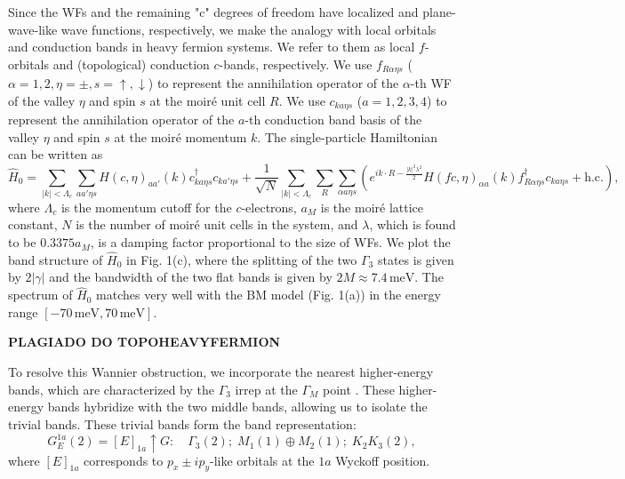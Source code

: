 Since the WFs and the remaining "c" degrees of freedom have localized and plane-wave-like wave functions, respectively, we make the analogy with local orbitals and conduction bands in heavy fermion systems. We refer to them as local \( f \)-orbitals and (topological) conduction \( c \)-bands, respectively. We use \( f_{R\alpha\eta s} \) (\(\alpha = 1, 2, \eta = \pm, s = \uparrow, \downarrow\)) to represent the annihilation operator of the \(\alpha\)-th WF of the valley \( \eta \) and spin \( s \) at the moiré unit cell \( R \). We use \( c_{ka\eta s} \) (\( a = 1, 2, 3, 4 \)) to represent the annihilation operator of the \( a\)-th conduction band basis of the valley \( \eta \) and spin \( s \) at the moiré momentum \( k \). The single-particle Hamiltonian can be written as
\[
\hat{H}_0 =
\sum_{|k| < \Lambda_c}
\sum_{aa'\eta s}
H(c,\eta)_{aa'}(k) c^\dagger_{ka\eta s} c_{ka'\eta s}
+ \frac{1}{\sqrt{N}}
\sum_{|k| < \Lambda_c}
\sum_{R}
\sum_{\alpha a \eta s}
\left( e^{i k \cdot R - \frac{|k|^2 \lambda^2}{2}}
H(fc,\eta)_{\alpha a}(k) f^\dagger_{R\alpha\eta s} c_{ka\eta s} + \text{h.c.} \right),
\]
where \( \Lambda_c \) is the momentum cutoff for the \( c \)-electrons, \( a_M \) is the moiré lattice constant, \( N \) is the number of moiré unit cells in the system, and \( \lambda \), which is found to be \( 0.3375 a_M \), is a damping factor proportional to the size of WFs. We plot the band structure of \( \hat{H}_0 \) in Fig. 1(c), where the splitting of the two \(\Gamma_3\) states is given by \( 2|\gamma| \) and the bandwidth of the two flat bands is given by \( 2M \approx 7.4\, \text{meV} \). The spectrum of \( \hat{H}_0 \) matches very well with the BM model (Fig. 1(a)) in the energy range \([-70\, \text{meV}, 70\, \text{meV}]\).

\textbf{PLAGIADO DO TOPOHEAVYFERMION}

\n\n


To resolve this Wannier obstruction, we incorporate the nearest higher-energy bands, which are characterized by the \(\Gamma_3\) irrep at the \(\Gamma_M\) point \cite{topoheavyfermion2022}. These higher-energy bands hybridize with the two middle bands, allowing us to isolate the trivial bands. These trivial bands form the band representation:
\begin{equation} \label{eq:trivial-irreps}
G_E^{1a}(2) = [E]_{1a} \uparrow G: \quad \Gamma_3(2); \; M_1(1) \oplus M_2(1); \; K_2 K_3(2),
\end{equation}
where \([E]_{1a}\) corresponds to \(p_x \pm i p_y\)-like orbitals at the \(1a\) Wyckoff position.

